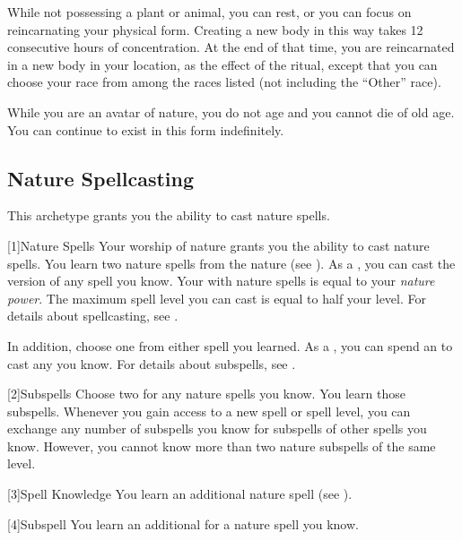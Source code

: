         While not possessing a plant or animal, you can rest, or you can focus on reincarnating your physical form.
        Creating a new body in this way takes 12 consecutive hours of concentration.
        At the end of that time, you are reincarnated in a new body in your location, as the effect of the  ritual, except that you can choose your race from among the races listed (not including the ``Other'' race).

        While you are an avatar of nature, you do not age and you cannot die of old age.
        You can continue to exist in this form indefinitely.

    \subsection{Nature Spellcasting}
        This archetype grants you the ability to cast nature spells.

        [1]{Nature Spells}
        Your worship of nature grants you the ability to cast nature spells.
        You learn two nature spells from the nature  (see ).
        As a , you can cast the  version of any spell you know.
        Your  with nature spells is equal to your \textit{nature power}.
        The maximum spell level you can cast is equal to half your level.
        For details about spellcasting, see .

        In addition, choose one  from either spell you learned.
        As a , you can spend an  to cast any  you know.
        For details about subspells, see .

        [2]{Subspells} Choose two  for any nature spells you know.
        You learn those subspells.
        Whenever you gain access to a new spell or spell level, you can exchange any number of subspells you know for subspells of other spells you know.
        However, you cannot know more than two nature subspells of the same level.

        [3]{Spell Knowledge}
        You learn an additional nature spell (see ).

        [4]{Subspell}
        You learn an additional  for a nature spell you know.

